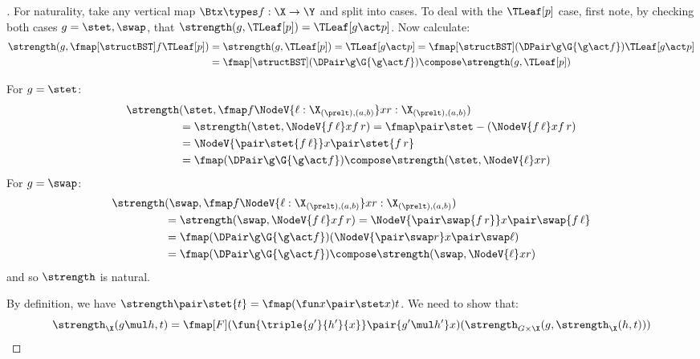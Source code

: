\begin{proof}[]%
  For naturality, take any vertical map $\Btx \types f : \X \to \Y$
  and split into cases. To deal with the $\TLeaf[p]$ case, first note, by
  checking both cases $g = \stet,\swap$,
  that $\strength(g, \TLeaf[p]) = \TLeaf[g \act p]$. Now calculate:
  \begin{align*}
  \strength(g, \fmap[\structBST] f \TLeaf[p])
  &=
  \strength(g, \TLeaf[p])
  =
  \TLeaf[g \act p]
  =
  \fmap[\structBST] (\DPair\g\G{\g \act f}) \TLeaf[g \act p]
  \\&=
  \fmap[\structBST] (\DPair\g\G{\g \act f}) \compose \strength(g, \TLeaf[p])
  \end{align*}

  For $g = \stet$:
  \begin{align*}
    \strength&(\stet, \fmap f
    \NodeV{\ell : \X_{(\prelt), (a,b)}}x{r : \X_{(\prelt), (a,b)}})
    \\&=
  \strength(\stet,
  \NodeV{f\,\ell}x{f\,r})
  =
  \fmap\pair\stet-(\NodeV{f\,\ell}x{f\,r})
  \\&=
  \NodeV{\pair\stet{f\,\ell}}x{\pair\stet{f\,r}}
  \\&=
  \fmap (\DPair\g\G{\g \act f}) \compose \strength(\stet,
  \NodeV{\ell}x{r})
  \end{align*}
  For $g = \swap$:
  \begin{align*}
    \strength&(\swap, \fmap f
    \NodeV{\ell : \X_{(\prelt), (a,b)}}x{r : \X_{(\prelt), (a,b)}})
    \\&=
    \strength(\swap,
    \NodeV{f\,\ell}x{f\,r })
    =
    \NodeV{\pair\swap{f\,r }}x{\pair\swap{f\,\ell}}
  \\&=
  \fmap (\DPair\g\G{\g \act f}) (\NodeV{\pair\swap r}x{\pair\swap \ell})
  \\&=
  \fmap (\DPair\g\G{\g \act f}) \compose \strength(\swap,
  \NodeV{\ell}x{r})
  \end{align*}
  and so $\strength$ is natural.

  By definition, we have
  \(
  \strength\pair\stet{t} = \fmap (\fun x\pair\stet x) t
  \).
  We need to show that:
  \[
  \strength_{\X}(g\mul h, t)
  =
  \fmap[F] (\fun{\triple{g'}{h'}{x}}\pair{g'\mul h'}x)
  (\strength_{G\times\X}(g,
   \strength_{\X}(h, t)))
   \]


\end{proof}
